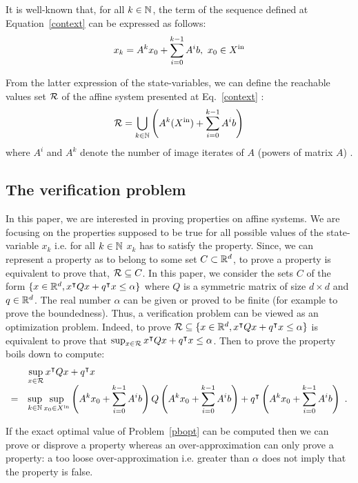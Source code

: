 \documentclass[10pt]{article}
\begin{document}
It is well-known that, for all $k\in\mathbb{N}$, the term of the sequence defined at Equation~\eqref{context} can be expressed as follows:
\[
x_k=A^k x_0+ \sum_{i=0}^{k-1} A^i b,\ x_0\in\xin
\]

From the latter expression of the state-variables, we can define the reachable values set $\mathcal{R}$ of the affine system presented at Eq.~\eqref{context} :
\begin{equation}
\label{reach}
\mathcal{R}=\bigcup_{k\in \mathbb{N}} \left(A^{k}(X^\mathrm{in})+\sum_{i=0}^{k-1} A^i b\right)
\end{equation}
where $A^i$ and $A^k$ denote the number of image iterates of $A$ (powers of matrix $A$) . 

\subsection{The verification problem}
In this paper, we are interested in proving properties on affine systems. We are focusing on the properties supposed to be true for all possible values of the state-variable $x_k$ i.e. for all $k\in\mathbb{N}$ $x_k$ has to satisfy the property. Since, we can represent a property as to belong to some set $C\subset \mathbb R^d$, to prove a property is equivalent to prove that, $\mathcal{R}\subseteq C$. In this paper, we consider the sets $C$  of the form $\{x\in\mathbb R^d, x^\intercal Q x+q^\intercal x\leq \alpha\}$ where $Q$ is a symmetric matrix of size $d\times d$ and $q\in\mathbb R^d$. The real number $\alpha$ can be given or proved to be finite (for example to prove the boundedness).  Thus, a verification problem can be viewed as an optimization problem. Indeed, to prove $\mathcal{R}\subseteq \{x\in\mathbb R^d, x^\intercal Q x+q^\intercal x\leq \alpha\}$ is equivalent to prove that
$\sup_{x\in\mathcal{R}} x^\intercal Q x+q^\intercal x\leq \alpha$.
Then to prove the property boils down to compute: 
\begin{equation}
\label{pbopt}
\begin{array}{ll}
&\displaystyle{\sup_{x\in\mathcal{R}} x^\intercal Q x+q^\intercal x}\\
=&\displaystyle{\sup_{k\in\mathbb{N}}\sup_{x_0\in X^\mathrm{in}}  \left(A^k x_0+ \sum_{i=0}^{k-1} A^i b \right) Q \left( A^k x_0+ \sum_{i=0}^{k-1} A^i b\right) +q^\intercal \left(A^k x_0+ \sum_{i=0}^{k-1} A^i b\right)}\enspace .
\end{array}
\end{equation} 

If the exact optimal value of Problem~\eqref{pbopt} can be computed then we can prove or disprove a property whereas an over-approximation can only prove a property: a too loose over-approximation i.e. greater than $\alpha$ does not imply that the property is false. 
\end{document}
